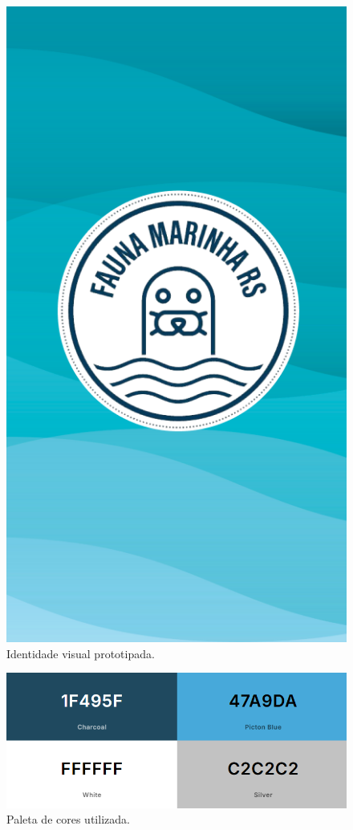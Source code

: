 \begin{figure}[H]
    \centering
    \includegraphics[height=0.5\textheight]{imagens/identidade-app.png}
    \caption{Identidade visual prototipada.}
    \label{fig:identidade-visual-mobile}
\end{figure}

\begin{figure}[H]
    \centering
    \includegraphics[width=1\textwidth]{imagens/paleta-cores.png}
    \caption{Paleta de cores utilizada.}
    \label{fig:paleta-cores}
\end{figure}

